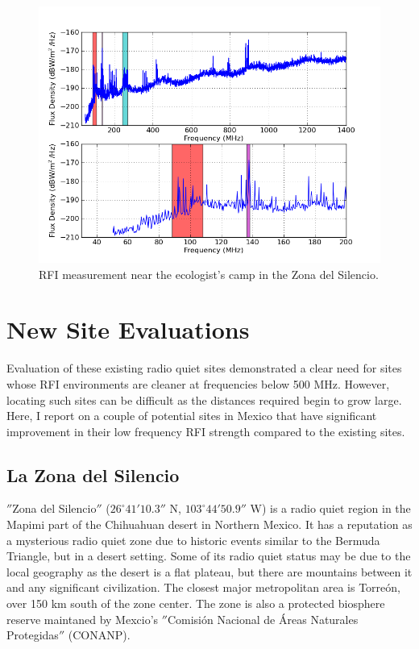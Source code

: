 \begin{figure}[htb]
\begin{center}
\includegraphics[width=0.9\linewidth]{RFI_testing/figures/ZdS_halfway_in_bands.png}
\caption{RFI measurement near the ecologist's camp in the Zona del Silencio.}
\label{Fig:zdsendrfi}
\end{center}
\end{figure}

\section{New Site Evaluations}

Evaluation of these existing radio quiet sites demonstrated a clear need for sites whose RFI environments are cleaner at frequencies below 500 MHz. However, locating such sites can be difficult as the distances required begin to grow large. Here, I report on a couple of potential sites in Mexico that have significant improvement in their low frequency RFI strength compared to the existing sites. 

\subsection{La Zona del Silencio}
$''$Zona del Silencio$''$ ($26^\circ 41' 10.3''$ N, $103^\circ 44' 50.9''$ W) is a radio quiet region in the Mapimi part of the Chihuahuan desert in Northern Mexico. It has a reputation as a mysterious radio quiet zone due to historic events similar to the Bermuda Triangle, but in a desert setting. Some of its radio quiet status may be due to the local geography as the desert is a flat plateau, but there are mountains between it and any significant civilization. The closest major metropolitan area is Torre\'{o}n, over 150 km south of the zone center. The zone is also a protected biosphere reserve maintaned by Mexcio's $''$Comisi\'{o}n Nacional de \'{A}reas Naturales Protegidas$''$ (CONANP). 

